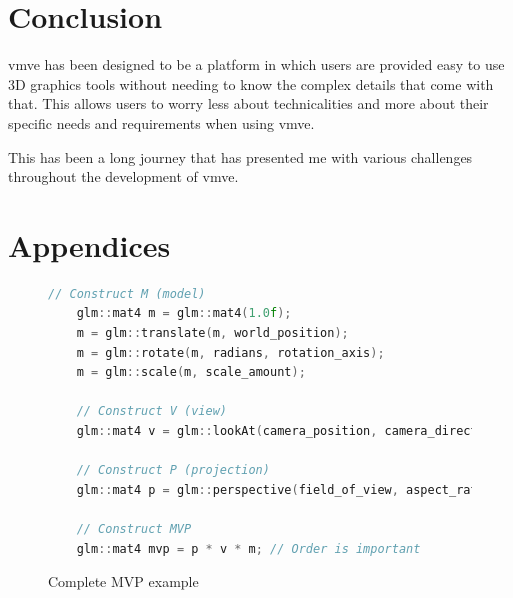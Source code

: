 \documentclass[11pt]{article}
\begin{document}
\section{Conclusion}

\gls{vmve} has been designed to be a platform in which users are provided easy to use
3D graphics tools without needing to know the complex details that come with
that. This allows users to worry less about technicalities and more about their
specific needs and requirements when using \gls{vmve}.

This has been a long journey that has presented me with various challenges
throughout the development of \gls{vmve}.


\clearpage
\printglossary

\clearpage
\printglossary[type=\acronymtype]






\section{Appendices}
\begin{figure}[ht]
  \centering
  \begin{lstlisting}[language=C++]
    // Construct M (model)
    glm::mat4 m = glm::mat4(1.0f);
    m = glm::translate(m, world_position);   
    m = glm::rotate(m, radians, rotation_axis); 
    m = glm::scale(m, scale_amount);

    // Construct V (view)
    glm::mat4 v = glm::lookAt(camera_position, camera_direction, camera_up);

    // Construct P (projection)
    glm::mat4 p = glm::perspective(field_of_view, aspect_ratio, near, far);

    // Construct MVP
    glm::mat4 mvp = p * v * m; // Order is important

  \end{lstlisting}
  \caption{Complete MVP example}
  \label{fig:local_to_world_appendix}
\end{figure}
\end{document}
